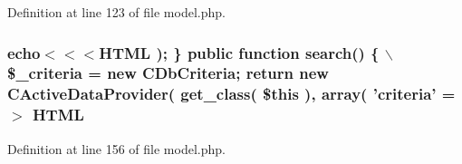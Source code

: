 Definition at line 123 of file model.php.

\hypertarget{gii_2model_2templates_2default_2model_8php_a41b069b7c63debb335b91e1dcda99046}{
\subsubsection[{HTML}]{\setlength{\rightskip}{0pt plus 5cm}echo$<$$<$$<${\bf HTML} ); \} public function search() \{ $\backslash$\$\_\-criteria = new CDbCriteria; return new CActiveDataProvider( get\_\-class( \$this ), {\bf array}( 'criteria' =$>$ {\bf HTML}}}
\label{gii_2model_2templates_2default_2model_8php_a41b069b7c63debb335b91e1dcda99046}


Definition at line 156 of file model.php.

